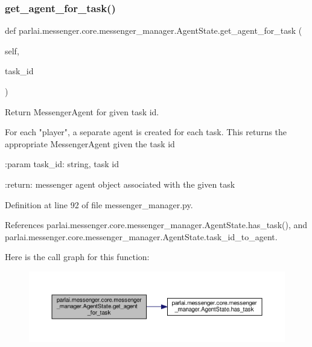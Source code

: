 \subsubsection{\texorpdfstring{get\+\_\+agent\+\_\+for\+\_\+task()}{get\_agent\_for\_task()}}
{\footnotesize\ttfamily def parlai.\+messenger.\+core.\+messenger\+\_\+manager.\+Agent\+State.\+get\+\_\+agent\+\_\+for\+\_\+task (\begin{DoxyParamCaption}\item[{}]{self,  }\item[{}]{task\+\_\+id }\end{DoxyParamCaption})}

\begin{DoxyVerb}Return MessengerAgent for given task id.

For each "player", a separate agent is created for each task. This
returns the appropriate MessengerAgent given the task id

:param task_id:
    string, task id

:return:
    messenger agent object associated with the given task
\end{DoxyVerb}
 

Definition at line 92 of file messenger\+\_\+manager.\+py.



References parlai.\+messenger.\+core.\+messenger\+\_\+manager.\+Agent\+State.\+has\+\_\+task(), and parlai.\+messenger.\+core.\+messenger\+\_\+manager.\+Agent\+State.\+task\+\_\+id\+\_\+to\+\_\+agent.

Here is the call graph for this function\+:
\nopagebreak
\begin{figure}[H]
\begin{center}
\leavevmode
\includegraphics[width=350pt]{classparlai_1_1messenger_1_1core_1_1messenger__manager_1_1AgentState_ac4c971108af734b4936ebcbc9f56fa34_cgraph}
\end{center}
\end{figure}
\mbox{\label{classparlai_1_1messenger_1_1core_1_1messenger__manager_1_1AgentState_aeb63554d836d69a6f829a67b7103f292}} 
